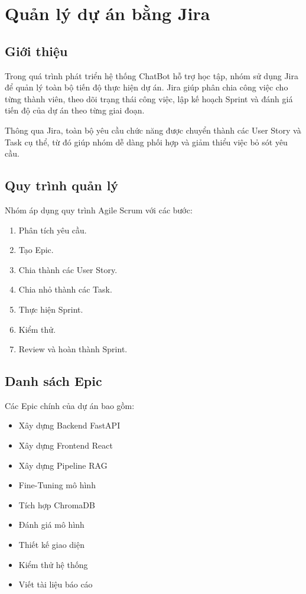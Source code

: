 \chapter{Quản lý dự án bằng Jira}

\section{Giới thiệu}

Trong quá trình phát triển hệ thống ChatBot hỗ trợ học tập, nhóm sử dụng Jira để quản lý toàn bộ tiến độ thực hiện dự án. Jira giúp phân chia công việc cho từng thành viên, theo dõi trạng thái công việc, lập kế hoạch Sprint và đánh giá tiến độ của dự án theo từng giai đoạn.

Thông qua Jira, toàn bộ yêu cầu chức năng được chuyển thành các User Story và Task cụ thể, từ đó giúp nhóm dễ dàng phối hợp và giảm thiểu việc bỏ sót yêu cầu.

\section{Quy trình quản lý}

Nhóm áp dụng quy trình Agile Scrum với các bước:

\begin{enumerate}
	\item Phân tích yêu cầu.
	\item Tạo Epic.
	\item Chia thành các User Story.
	\item Chia nhỏ thành các Task.
	\item Thực hiện Sprint.
	\item Kiểm thử.
	\item Review và hoàn thành Sprint.
\end{enumerate}

\section{Danh sách Epic}

Các Epic chính của dự án bao gồm:

\begin{itemize}
	\item Xây dựng Backend FastAPI
	\item Xây dựng Frontend React
	\item Xây dựng Pipeline RAG
	\item Fine-Tuning mô hình
	\item Tích hợp ChromaDB
	\item Đánh giá mô hình
	\item Thiết kế giao diện
	\item Kiểm thử hệ thống
	\item Viết tài liệu báo cáo
\end{itemize}
